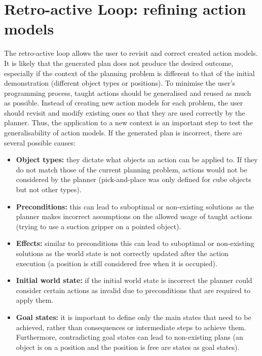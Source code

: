 \section{Retro-active Loop: refining action models}
The retro-active loop allows the user to revisit and correct created action models.
It is likely that the generated plan does not produce the desired outcome, especially if the context of the planning problem is different to that of the initial demonstration (\eg different object types or positions).
To minimise the user's programming process, taught actions should be generalised and reused as much as possible.
Instead of creating new action models for each problem, the user should revisit and modify existing ones so that they are used correctly by the planner.
Thus, the application to a new context is an important step to test the generalisability of action models.
If the generated plan is incorrect, there are several possible causes:
\begin{itemize}
	\item \textbf{Object types:} they dictate what objects an action can be applied to. If they do not match those of the current planning problem, actions would not be considered by the planner (\eg pick-and-place was only defined for cube objects but not other types).
	\item \textbf{Preconditions:} this can lead to suboptimal or non-existing solutions as the planner makes incorrect assumptions on the allowed usage of taught actions (\eg trying to use a suction gripper on a pointed object).
	\item \textbf{Effects:} similar to preconditions this can lead to suboptimal or non-existing solutions as the world state is not correctly updated after the action execution (\eg a position is still considered free when it is occupied).
	\item \textbf{Initial world state:} if the initial world state is incorrect the planner could consider certain actions as invalid due to preconditions that are required to apply them.
	\item \textbf{Goal states:} it is important to define only the main states that need to be achieved, rather than consequences or intermediate steps to achieve them. Furthermore, contradicting goal states can lead to non-existing plans (\eg an object is on a position and the position is free are states as goal states).
\end{itemize}

